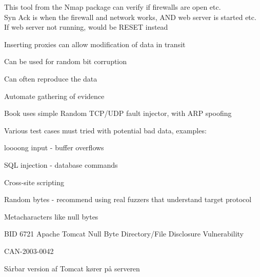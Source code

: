 \documentclass[Screen16to9,17pt]{foils}
\begin{document}
This tool from the Nmap package can verify if firewalls are open etc. \\
Syn Ack is when the firewall and network works, AND web server is started etc.\\
If web server not running, would be RESET instead






\begin{list1}
\item Inserting proxies can allow modification of data in transit
\item Can be used for random bit corruption
\item Can often reproduce the data
\item Automate gathering of evidence
\item Book uses simple Random TCP/UDP fault injector, with ARP spoofing
\item Various test cases must tried with potential bad data, examples:
\begin{list2}
\item loooong input - buffer overflows
\item SQL injection - database commands
\item Cross-site scripting
\item Random bytes - recommend using real fuzzers that understand target protocol
\item Metacharacters like null bytes
\end{list2}
\end{list1}




\begin{list1}
\item BID 6721 Apache Tomcat Null Byte Directory/File Disclosure Vulnerability
\item {}
\item CAN-2003-0042
\end{list1}




\centerline{Sårbar version af Tomcat kører på serveren}
\end{document}
